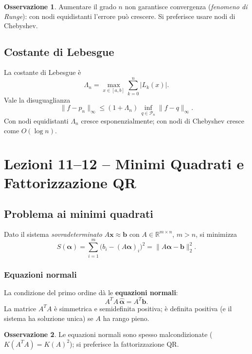 \documentclass[12pt,a4paper]{article}
\theoremstyle{definition}
\newtheorem{osservazione}{Osservazione}[section]
\begin{document}
\begin{osservazione}
Aumentare il grado $n$ non garantisce convergenza (\emph{fenomeno di Runge}): con nodi equidistanti l'errore può crescere. Si preferisce usare nodi di Chebyshev.
\end{osservazione}

\subsection{Costante di Lebesgue}

La costante di Lebesgue è
\[
  \Lambda_n = \max_{x \in [a,b]} \sum_{k=0}^{n} |L_k(x)|.
\]
Vale la disuguaglianza
\[
  \|f - p_n\|_\infty \leq (1 + \Lambda_n)\,\inf_{q \in \mathcal{P}_n} \|f - q\|_\infty.
\]
Con nodi equidistanti $\Lambda_n$ cresce esponenzialmente; con nodi di Chebyshev cresce come $O(\log n)$.

\section{Lezioni 11--12 -- Minimi Quadrati e Fattorizzazione QR}

\subsection{Problema ai minimi quadrati}

Dato il sistema \emph{sovradeterminato} $A\mathbf{x} \approx \mathbf{b}$ con $A \in \mathbb{R}^{m \times n}$, $m > n$, si minimizza
\[
  S(\boldsymbol{\alpha}) = \sum_{i=1}^{m} \bigl(b_i - (A\boldsymbol{\alpha})_i\bigr)^2
  = \|A\boldsymbol{\alpha} - \mathbf{b}\|_2^2.
\]

\subsubsection{Equazioni normali}

La condizione del primo ordine dà le \textbf{equazioni normali}:
\[
  A^T A\,\hat{\boldsymbol{\alpha}} = A^T \mathbf{b}.
\]
La matrice $A^T A$ è simmetrica e semidefinita positiva; è definita positiva (e il sistema ha soluzione unica) se $A$ ha rango pieno.

\begin{osservazione}
Le equazioni normali sono spesso malcondizionate ($K(A^T A) = K(A)^2$); si preferisce la fattorizzazione QR.
\end{osservazione}
\end{document}
